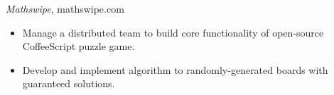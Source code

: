{\sl Mathswipe}, mathswipe.com
\begin{itemize} \itemsep -2pt %
  \item Manage a distributed team to build core functionality of open-source
  CoffeeScript puzzle game.
  \item Develop and implement algorithm to randomly-generated boards with guaranteed solutions.
\end{itemize}
